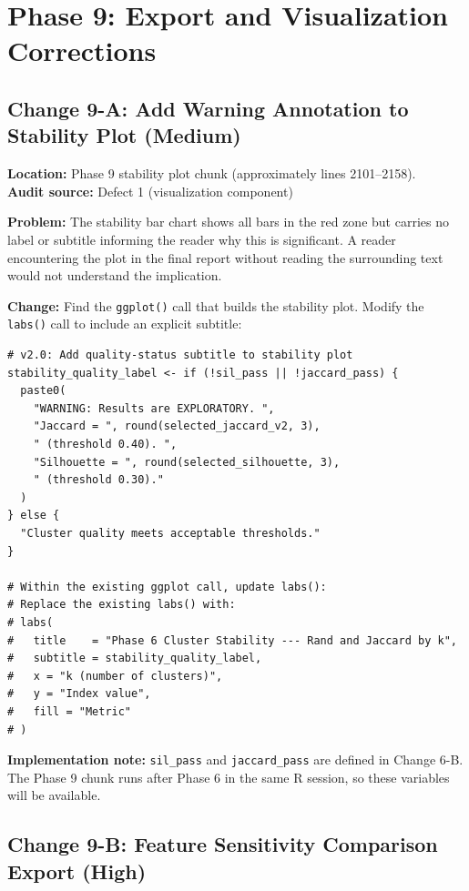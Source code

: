 \documentclass[11pt]{article}
\newcommand{\rcode}[1]{\texttt{#1}}
\begin{document}
\section{Phase 9: Export and Visualization Corrections}

\subsection{Change 9-A: Add Warning Annotation to Stability Plot (Medium)}

\textbf{Location:} Phase 9 stability plot chunk (approximately
lines 2101--2158).\\
\textbf{Audit source:} Defect 1 (visualization component)

\textbf{Problem:} The stability bar chart shows all bars in the red zone
but carries no label or subtitle informing the reader why this is
significant. A reader encountering the plot in the final report without
reading the surrounding text would not understand the implication.

\textbf{Change:} Find the \rcode{ggplot()} call that builds the stability
plot. Modify the \rcode{labs()} call to include an explicit subtitle:

\begin{lstlisting}
# v2.0: Add quality-status subtitle to stability plot
stability_quality_label <- if (!sil_pass || !jaccard_pass) {
  paste0(
    "WARNING: Results are EXPLORATORY. ",
    "Jaccard = ", round(selected_jaccard_v2, 3),
    " (threshold 0.40). ",
    "Silhouette = ", round(selected_silhouette, 3),
    " (threshold 0.30)."
  )
} else {
  "Cluster quality meets acceptable thresholds."
}

# Within the existing ggplot call, update labs():
# Replace the existing labs() with:
# labs(
#   title    = "Phase 6 Cluster Stability --- Rand and Jaccard by k",
#   subtitle = stability_quality_label,
#   x = "k (number of clusters)",
#   y = "Index value",
#   fill = "Metric"
# )
\end{lstlisting}

\textbf{Implementation note:} \rcode{sil\_pass} and \rcode{jaccard\_pass}
are defined in Change 6-B. The Phase 9 chunk runs after Phase 6 in the
same R session, so these variables will be available.

\subsection{Change 9-B: Feature Sensitivity Comparison Export (High)}
\end{document}
